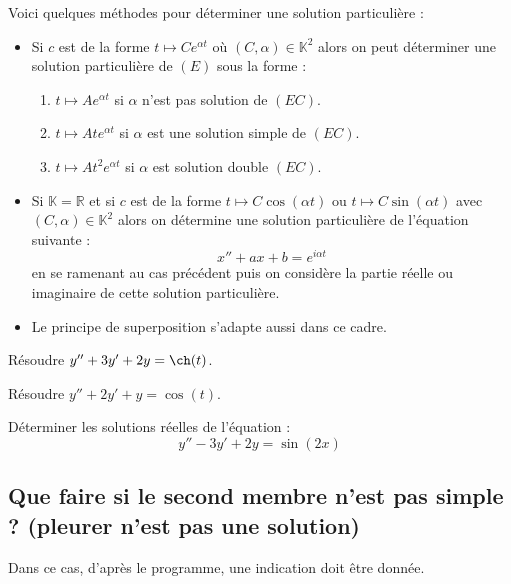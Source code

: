 \documentclass[french,11pt,twoside]{VcCours}
\begin{document}
Voici quelques méthodes pour déterminer une solution particulière : 

\begin{itemize}
\item Si $c$ est de la forme $t \mapsto C e^{\alpha t}$ où $(C, \alpha) \in \mathbb{K}^2$ alors on peut déterminer une solution particulière de $(E)$ sous la forme :
\begin{enumerate}
\item $t \mapsto A e^{\alpha t}$ si $\alpha$ n'est pas solution de $(EC)$.
\item $t \mapsto At e^{\alpha t}$ si $\alpha$ est une solution \og simple \fg de $(EC)$.
\item $t \mapsto At^2 e^{\alpha t}$ si $\alpha$ est solution \og double \fg $(EC)$.
\end{enumerate}
\item Si $\mathbb{K}= \mathbb{R}$ et si $c$ est de la forme $t \mapsto C \cos(\alpha t)$ ou $t \mapsto C \sin(\alpha t)$ avec $(C, \alpha) \in \mathbb{K}^2$ alors on détermine une solution particulière de l'équation suivante :
$$ x''+ax+b= e^{i \alpha t}$$
en se ramenant au cas précédent puis on considère la partie réelle ou imaginaire de cette solution particulière.
\item Le principe de superposition s'adapte aussi dans ce cadre.
\end{itemize}

\begin{Exemple} Résoudre $y'' + 3y' + 2y = \ch(t)$.

\vspace*{13cm}
\end{Exemple}

\begin{Exemple} Résoudre $y''+2y'+y= \cos(t)$.
  
  \newpage
\vspace*{4cm}
\end{Exemple}

\begin{ApplicationDirecte}{}Déterminer les solutions réelles de l'équation :
  \[
   y'' - 3y' + 2y = \sin(2x)
  \]
\end{ApplicationDirecte} 
\subsection{Que faire si le second membre n'est pas \og simple \fg ? (pleurer n'est pas une solution)}
Dans ce cas, d'après le programme, une indication doit être donnée.
\end{document}
